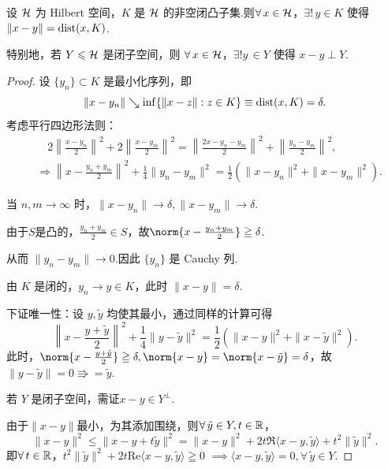 \begin{theorem}[最近点投影]
    设 $\mathcal{H}$ 为 Hilbert 空间，$K$ 是 $\mathcal{H}$ 的非空闭凸子集.则$\forall\, x \in \mathcal{H}$，$\exists ! \,y \in K$ 使得 $\|x - y\| = \operatorname{dist}(x, K)$.\par
    特别地，若 $Y \leqslant \mathcal{H}$ 是闭子空间，则 $\forall\, x \in \mathcal{H}$，$\exists ! y\,\in Y$ 使得 $x - y \perp Y$.
\end{theorem}
\begin{proof}
    设 $\{y_n\} \subset K$ 是最小化序列，即
    \[
        \|x - y_n\| \searrow \inf \{\|x - z\| : z \in K\} \equiv \operatorname{dist}(x, K) = \delta.
    \]
    考虑平行四边形法则：
    \begin{align*}
        &\quad2\left\| \frac{x - y_n}{2} \right\|^2 + 2\left\| \frac{x - y_m}{2} \right\|^2 = \left\| \frac{2x - y_n - y_m}{2} \right\|^2 + \left\| \frac{y_n - y_m}{2} \right\| ^2, \\
        &\Rightarrow \left\| x - \frac{y_n + y_m}{2} \right\|^2 + \frac{1}{4} \|y_n - y_m\|^2 = \frac{1}{2} (\|x - y_n\|^2 + \|x - y_m\|^2).
    \end{align*}

    当 $n, m \to \infty$ 时，$ \|x - y_n\| \to \delta, \|x - y_m\| \to \delta$.\par
    由于$S$是凸的，$\frac{y_n+y_m}{2}\in S$，故$\norm{x - \frac{y_n + y_m}{2}} \geqq \delta$.\par
    从而 $\|y_n - y_m\| \to 0$.因此 $\{y_n\}$ 是 Cauchy 列.\par
    由 $K$ 是闭的，$y_n \to y \in K$，此时 $\|x - y\| = \delta$.\par
    下证唯一性：设 $y, \tilde{y}$ 均使其最小，通过同样的计算可得
    \begin{equation*}
        \left\| x - \frac{y + \tilde{y}}{2} \right\|^2 + \frac{1}{4} \|y - \tilde{y}\|^2 = \frac{1}{2} (\|x - y\|^2 + \|x - \tilde{y}\|^2).
    \end{equation*}
    此时，$\norm{x-\frac{y+\tilde{y}}{2}}\geqq \delta,\norm{x-y}=\norm{x-\tilde{y}}=\delta$，故
    $\|y-\tilde{y}\|=0\Rrightarrow = \tilde{y}$.\par
    若 $Y$ 是闭子空间，需证$x - y \in Y^\perp$.\par
    由于$\|x-y\|$最小，为其添加围绕，则$\forall\, \tilde{y} \in Y, t \in \mathbb{R}$，
    \begin{equation*}
        \|x - y\|^2 \leq \|x - y + t\tilde{y}\|^2 = \|x - y\|^2 + 2t\Re \langle x - y, \tilde{y} \rangle + t^2\|\tilde{y}\|^2.
    \end{equation*}
    即$\forall\, t \in \mathbb{R}$，$t^2\|\tilde{y}\|^2 + 2t\text{Re} \langle x - y, \tilde{y} \rangle \geqq 0$
    $\implies \langle x - y, \tilde{y} \rangle = 0, \forall\, \tilde{y} \in Y$.
\end{proof}


